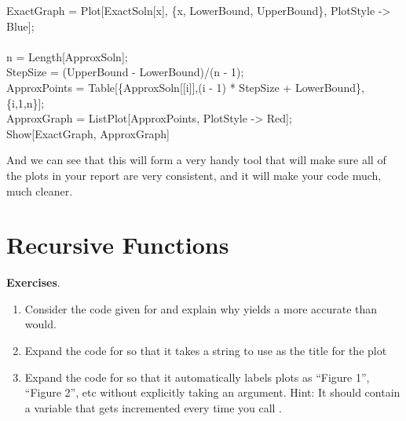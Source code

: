 \begin{code}
	   ExactGraph = Plot[ExactSoln[x], \{x, LowerBound, UpperBound\}, PlotStyle -> Blue];\\
	   \\
	   n = Length[ApproxSoln];\\
	   StepSize = (UpperBound - LowerBound)/(n - 1);\\
	   ApproxPoints = Table[\{ApproxSoln[[i]],(i - 1) * StepSize + LowerBound\},\{i,1,n\}];\\
	   ApproxGraph = ListPlot[ApproxPoints, PlotStyle -> Red];\\
	   Show[ExactGraph, ApproxGraph]
\end{code}

And we can see that this will form a very handy tool that will make sure all of the plots in your report are very consistent, and it will make your code much, much cleaner.

\section{Recursive Functions}


\textbf{Exercises}.
\begin{enumerate}
	   \item Consider the code given for  and explain why  yields a more accurate  than  would.
	   \item Expand the code for  so that it takes a string to use as the title for the plot
	   \item Expand the code for  so that it automatically labels plots as ``Figure 1'', ``Figure 2'', etc without explicitly taking an argument. Hint: It should contain a variable that gets incremented every time you call . 
\end{enumerate}
